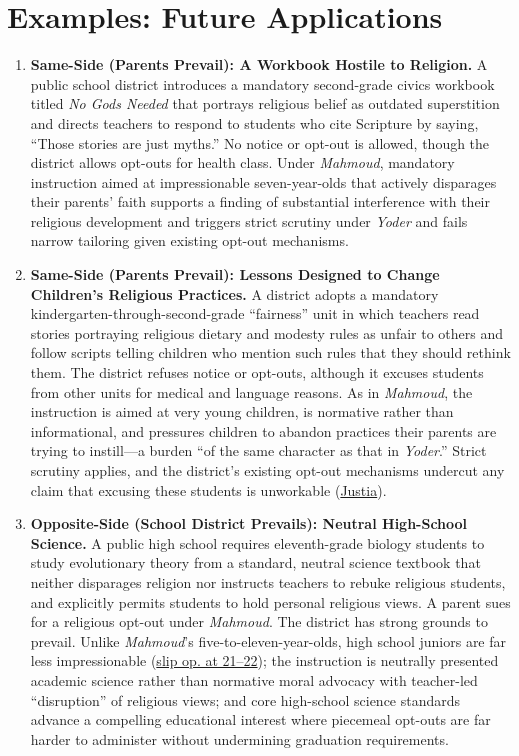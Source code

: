 \documentclass[12pt]{article}
\begin{document}
\section{Examples: Future Applications}
\begin{enumerate}

\item \textbf{Same-Side (Parents Prevail): A Workbook Hostile to Religion.} A public school district introduces a mandatory second-grade civics workbook titled \textit{No Gods Needed} that portrays religious belief as outdated superstition and directs teachers to respond to students who cite Scripture by saying, ``Those stories are just myths.'' No notice or opt-out is allowed, though the district allows opt-outs for health class. Under \textit{Mahmoud}, mandatory instruction aimed at impressionable seven-year-olds that actively disparages their parents' faith supports a finding of substantial interference with their religious development and triggers strict scrutiny under \textit{Yoder} and fails narrow tailoring given existing opt-out mechanisms.

\item \textbf{Same-Side (Parents Prevail): Lessons Designed to Change Children's Religious Practices.} A district adopts a mandatory kindergarten-through-second-grade ``fairness'' unit in which teachers read stories portraying religious dietary and modesty rules as unfair to others and follow scripts telling children who mention such rules that they should rethink them. The district refuses notice or opt-outs, although it excuses students from other units for medical and language reasons. As in \textit{Mahmoud}, the instruction is aimed at very young children, is normative rather than informational, and pressures children to abandon practices their parents are trying to instill---a burden ``of the same character as that in \textit{Yoder}.'' Strict scrutiny applies, and the district's existing opt-out mechanisms undercut any claim that excusing these students is unworkable (\href{https://supreme.justia.com/cases/federal/us/606/24-297/}{Justia}).

\item \textbf{Opposite-Side (School District Prevails): Neutral High-School Science.} A public high school requires eleventh-grade biology students to study evolutionary theory from a standard, neutral science textbook that neither disparages religion nor instructs teachers to rebuke religious students, and explicitly permits students to hold personal religious views. A parent sues for a religious opt-out under \textit{Mahmoud}. The district has strong grounds to prevail. Unlike \textit{Mahmoud}'s five-to-eleven-year-olds, high school juniors are far less impressionable (\href{https://www.law.cornell.edu/supremecourt/text/24-297}{slip op. at 21--22}); the instruction is neutrally presented academic science rather than normative moral advocacy with teacher-led ``disruption'' of religious views; and core high-school science standards advance a compelling educational interest where piecemeal opt-outs are far harder to administer without undermining graduation requirements.


\end{enumerate}
\end{document}
